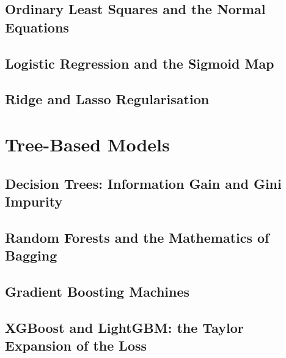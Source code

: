\subsection{Ordinary Least Squares and the Normal Equations}


\subsection{Logistic Regression and the Sigmoid Map}

\subsection{Ridge and Lasso Regularisation}


\section{Tree-Based Models}
\label{sec:trees}

\subsection{Decision Trees: Information Gain and Gini Impurity}


\subsection{Random Forests and the Mathematics of Bagging}

\subsection{Gradient Boosting Machines}

\subsection{XGBoost and LightGBM: the Taylor Expansion of the Loss}


